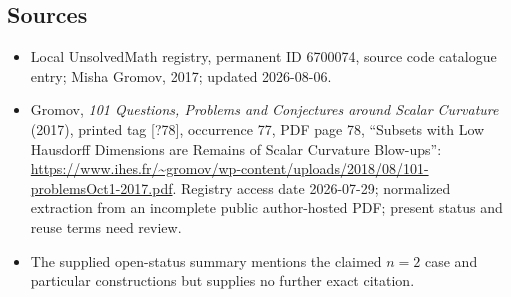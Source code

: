 \documentclass[11pt]{article}
\begin{document}
\subsection{Sources}
\begin{itemize}
\item Local UnsolvedMath registry, permanent ID 6700074, source code catalogue entry; Misha Gromov, 2017; updated 2026-08-06.
\item Gromov, \emph{101 Questions, Problems and Conjectures around Scalar Curvature} (2017), printed tag [?78], occurrence 77, PDF page 78, ``Subsets with Low Hausdorff Dimensions are Remains of Scalar Curvature Blow-ups'': \url{https://www.ihes.fr/~gromov/wp-content/uploads/2018/08/101-problemsOct1-2017.pdf}. Registry access date 2026-07-29; normalized extraction from an incomplete public author-hosted PDF; present status and reuse terms need review.
\item The supplied open-status summary mentions the claimed \(n=2\) case and particular constructions but supplies no further exact citation.
\end{itemize}
\end{document}
